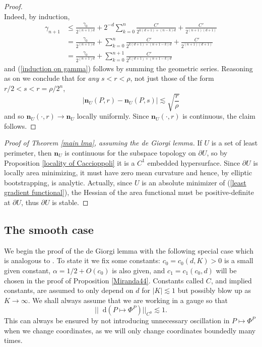 \documentclass[reqno,11pt]{amsart}
\newcommand*\dif{\mathop{}\!\mathrm{d}}
\newcommand{\normal}{\mathbf n}
\theoremstyle{definition}
\numberwithin{equation}{section}
\begin{document}
\begin{proof}
\begin{equation}
\end{equation}
Indeed, by induction,
\begin{align*}
\gamma_{n + 1}
&\leq \frac{\gamma_0}{2^{(n + 1)d}} + 2^{-d} \sum_{k=0}^n \frac{C'}{2^{k(d + 1) + (n - k)d}} + \frac{C'}{2^{(n + 1)(d + 1)}} \\
&= \frac{\gamma_0}{2^{(n + 1)d}} + \sum_{k=0}^n \frac{C'}{2^{k(d + 1) + (n + 1 - k)d}} + \frac{C'}{2^{(n + 1)(d + 1)}} \\
&= \frac{\gamma_0}{2^{(n + 1)d}} + \sum_{k=0}^{n + 1} \frac{C'}{2^{k(d + 1) + (n + 1 - k)d}}
\end{align*}
and (\ref{induction on gamma}) follows by summing the geometric series.
Reasoning as on \cite[pg100]{Giusti77} we conclude that for \emph{any} $s < r < \rho$, not just those of the form $r/2 < s < r = \rho/2^n$,
$$|\normal_U(P, r) - \normal_U(P, s)| \lesssim \sqrt{\frac{r}{\rho}}$$
and so $\normal_U(\cdot, r) \to \normal_U$ locally uniformly.
Since $\normal_U(\cdot, r)$ is continuous, the claim follows.
\end{proof}

\begin{proof}[Proof of Theorem \ref{main lma}, assuming the de Giorgi lemma]
If $U$ is a set of least perimeter, then $\normal_U$ is continuous for the subspace topology on $\partial U$, so by Proposition \ref{locality of Caccioppoli} it is a $C^1$ embedded hypersurface.
Since $\partial U$ is locally area minimizing, it must have zero mean curvature and hence, by elliptic bootstrapping, is analytic.
Actually, since $U$ is an absolute minimizer of (\ref{least gradient functional}), the Hessian of the area functional must be positive-definite at $\partial U$, thus $\partial U$ is stable.
\end{proof}


\subsection{The smooth case}
We begin the proof of the de Giorgi lemma with the following special case which is analogous to \cite[Lemma 6.4]{Giusti77}.
To state it we fix some constants: $c_0 = c_0(d, K) > 0$ is a small given constant, $\alpha = 1/2 + O(c_0)$ is also given, and $c_1 = c_1(c_0, d)$ will be chosen in the proof of Proposition \ref{Miranda44}.
Constants called $C$, and implied constants, are assumed to only depend on $d$ for $|K| \lesssim 1$ but possibly blow up as $K \to \infty$.
We shall always assume that we are working in a gauge so that
\begin{equation}\label{oscillation of isometries}
||\dif(P \mapsto \Phi^P)||_{C^0} \lesssim 1.
\end{equation}
This can always be ensured by not introducing unnecessary oscillation in $P \mapsto \Phi^P$ when we change coordinates, as we will only change coordinates boundedly many times.
\end{document}
